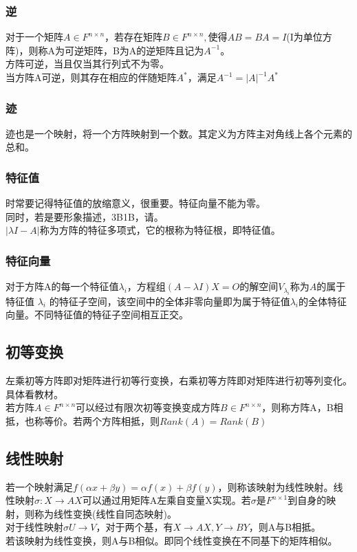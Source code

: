 \documentclass[UTF8]{ctexart}
\begin{document}
	\subsubsection{逆}
	对于一个矩阵$A\in F^{n\times n}$，若存在矩阵$B\in F^{n\times n},$使得$AB=BA=I$(I为单位方阵)，则称A为可逆矩阵，B为A的逆矩阵且记为$A^{-1}$。\\
	\indent
	方阵可逆，当且仅当其行列式不为零。\\
	\indent
	当方阵A可逆，则其存在相应的伴随矩阵$A^{*}$，满足$A^{-1}=|A|^{-1}A^{*}$
	\subsubsection{迹}
	迹也是一个映射，将一个方阵映射到一个数。其定义为方阵主对角线上各个元素的总和。
	\subsubsection{特征值}
	时常要记得特征值的放缩意义，很重要。特征向量不能为零。\\
	\indent
	同时，若是要形象描述，3B1B，请。\\
	\indent
	$|\lambda I-A|$称为方阵的特征多项式，它的根称为特征根，即特征值。
	\subsubsection{特征向量}
	对于方阵A的每一个特征值$\lambda_i$，方程组$(A-\lambda I)X=\mathit{O}$的解空间$V_{\lambda_{i}}$称为$A$的属于特征值 $\lambda_{i}$ 的特征子空间，该空间中的全体非零向量即为属于特征值$\lambda_{i}$的全体特征向量。不同特征值的特征子空间相互正交。
	\subsection{初等变换}
	左乘初等方阵即对矩阵进行初等行变换，右乘初等方阵即对矩阵进行初等列变化。具体看教材。\\
	\indent
	若方阵$A\in F^{n\times n}$可以经过有限次初等变换变成方阵$B\in F^{n\times n}$，则称方阵A，B相抵，也称等价。若两个方阵相抵，则$Rank(A)=Rank(B)$
	\subsection{线性映射}
	若一个映射满足$f(\alpha x+\beta y)=\alpha f(x)+\beta f(y)$，则称该映射为线性映射。线性映射$\sigma:X\rightarrow AX$可以通过用矩阵A左乘自变量X实现。若$\sigma$是$F^{n\times 1}$到自身的映射，则称为线性变换(线性自同态映射)。\\
	\indent
	对于线性映射$\sigma U\rightarrow V$，对于两个基，有$X\rightarrow AX,Y\rightarrow BY$，则A与B相抵。\\
	\indent
	若该映射为线性变换，则A与B相似。即同个线性变换在不同基下的矩阵相似。
\end{document}
